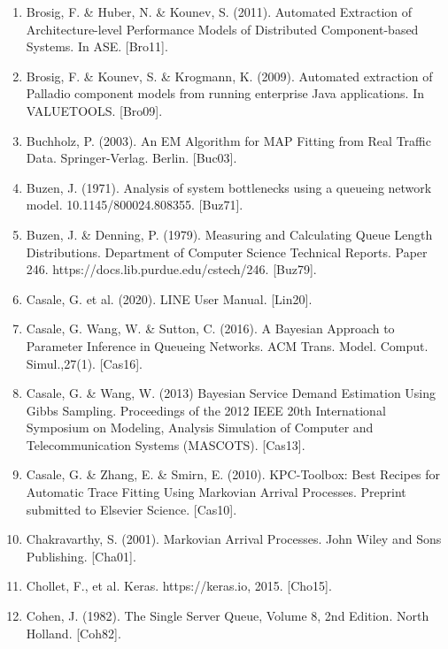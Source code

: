 \documentclass[a4paper,11pt,titlepage]{article}
\begin{document}
\begin{enumerate}
\item Brosig, F. & Huber, N. & Kounev, S. (2011). Automated Extraction of Architecture-level Performance Models of Distributed Component-based Systems. In ASE. [Bro11].

\item Brosig, F. & Kounev, S. & Krogmann, K. (2009). Automated extraction of Palladio component models from running enterprise Java applications. In VALUETOOLS. [Bro09].

\item Buchholz, P. (2003). An EM Algorithm for MAP Fitting from Real Traffic Data. Springer-Verlag. Berlin. [Buc03].

\item Buzen, J. (1971). Analysis of system bottlenecks using a queueing network model. 10.1145/800024.808355. [Buz71].

\item Buzen, J. & Denning, P. (1979). Measuring and Calculating Queue Length Distributions.
Department of Computer Science Technical Reports. Paper 246. https://docs.lib.purdue.edu/cstech/246. [Buz79].

\item Casale, G. et al. (2020). LINE User Manual. [Lin20]. 

\item Casale, G. Wang, W. & Sutton, C. (2016). A Bayesian Approach to Parameter Inference in Queueing Networks. ACM Trans. Model. Comput. Simul.,27(1). [Cas16].

\item Casale, G. & Wang, W. (2013) Bayesian Service Demand Estimation Using Gibbs Sampling. Proceedings of the 2012 IEEE 20th International Symposium on Modeling, Analysis  Simulation of Computer and Telecommunication Systems (MASCOTS). [Cas13]. 

\item Casale, G. & Zhang, E. & Smirn, E. (2010). KPC-Toolbox: Best Recipes for Automatic Trace Fitting Using Markovian Arrival Processes. Preprint submitted to Elsevier Science. [Cas10].

\item Chakravarthy, S. (2001). Markovian Arrival Processes. John Wiley and Sons Publishing. [Cha01]. 

\item Chollet, F., et al. Keras. https://keras.io, 2015. [Cho15]. 

\item Cohen, J. (1982). The Single Server Queue, Volume 8, 2nd Edition. North Holland. [Coh82]. 


\end{enumerate}
\end{document}
